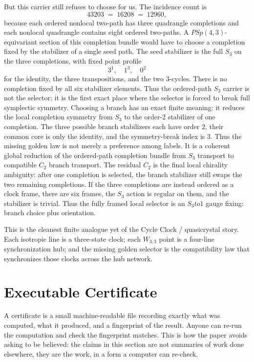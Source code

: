 \documentclass[12pt,a4paper]{article}
\def\mathrm#1{#1}%
\def\cdot{ }%
\def\to{ to }%
\theoremstyle{definition}
\newcommand{\PSp}{\mathrm{PSp}}
\begin{document}
But this carrier still refuses to choose for us.  The incidence count is
\[
4320\cdot 3 \;=\; 1620\cdot 8 \;=\; 12960,
\]
because each ordered nonlocal two-path has three quadrangle completions
and each nonlocal quadrangle contains eight ordered two-paths.  A
$\PSp(4,3)$-equivariant section of this completion bundle would have to
choose a completion fixed by the stabilizer of a single seed path.  The
seed stabilizer is the full $S_3$ on the three completions, with fixed
point profile
\[
3^1,\quad 1^3,\quad 0^2
\]
for the identity, the three transpositions, and the two $3$-cycles.
There is no completion fixed by all six stabilizer elements.  Thus the
ordered-path $S_3$ carrier is not the selector; it is the first exact
place where the selector is forced to break full symplectic symmetry.
Choosing a branch has an exact finite meaning: it reduces the local
completion symmetry from $S_3$ to the order-$2$ stabilizer of one
completion.  The three possible branch stabilizers each have order
$2$, their common core is only the identity, and the symmetry-break
index is $3$.  Thus the missing golden law is not merely a preference
among labels.  It is a coherent global reduction of the ordered-path
completion bundle from $S_3$ transport to compatible $C_2$ branch
transport.  The residual $C_2$ is the final local chirality ambiguity:
after one completion is selected, the branch stabilizer still swaps the
two remaining completions.  If the three completions are instead
ordered as a clock frame, there are six frames, the $S_3$ action is
regular on them, and the stabilizer is trivial.  Thus the fully framed
local selector is an $S_3\to 1$ gauge fixing: branch choice plus
orientation.

This is the cleanest finite analogue yet of the Cycle Clock /
quasicrystal story.  Each isotropic line is a three-state clock; each
$W_{3,3}$ point is a four-line synchronization hub; and the missing
golden selector is the compatibility law that synchronizes those clocks
across the hub network.

\section*{Executable Certificate}

\begin{plainbox}
A certificate is a small machine-readable file recording exactly what was computed,
what it produced, and a fingerprint of the result. Anyone can re-run the computation and
check the fingerprint matches. This is how the paper avoids asking to be believed: the
claims in this section are not summaries of work done elsewhere, they are the work, in a
form a computer can re-check.
\end{plainbox}
\end{document}
